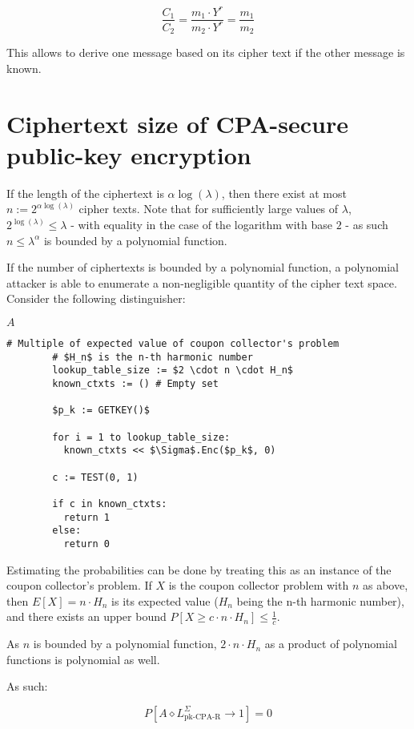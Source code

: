 \documentclass[a4paper]{scrreprt}
\begin{document}
\[
  \frac{C_1}{C_2} = \frac{m_1 \cdot Y^r}{m_2 \cdot Y^r} = \frac{m_1}{m_2}
\]

This allows to derive one message based on its cipher text if the other message
is known.

\section{Ciphertext size of CPA-secure public-key encryption}

If the length of the ciphertext is $\alpha \log(\lambda)$, then there exist at
most $n := 2^{\alpha \log(\lambda)}$ cipher texts. Note that for sufficiently large
values of $\lambda$, $2^{\log(\lambda)} \leq \lambda$ - with equality in the
case of the logarithm with base $2$ -  as such $n \leq
\lambda^\alpha$ is bounded by a polynomial function.

If the number of ciphertexts is bounded by a polynomial function, a polynomial
attacker is able to enumerate a non-negligible quantity of the cipher text
space. Consider the following distinguisher:

\begin{library}{$A$}
	\begin{lstlisting}[mathescape=true,autogobble=true]
		# Multiple of expected value of coupon collector's problem
		# $H_n$ is the n-th harmonic number
		lookup_table_size := $2 \cdot n \cdot H_n$
		known_ctxts := () # Empty set

		$p_k := GETKEY()$

		for i = 1 to lookup_table_size:
		  known_ctxts << $\Sigma$.Enc($p_k$, 0)

		c := TEST(0, 1)

		if c in known_ctxts:
		  return 1
		else:
		  return 0
	\end{lstlisting}
\end{library}

Estimating the probabilities can be done by treating this as an instance of the
coupon collector's problem. If $X$ is the coupon collector problem with $n$ as
above, then $E[X] = n \cdot H_n$ is its expected value ($H_n$ being the n-th
harmonic number), and there exists an upper bound $P[X \geq c \cdot n \cdot
H_n] \leq \frac{1}{c}$.

As $n$ is bounded by a polynomial function, $2 \cdot n \cdot H_n$ as a product
of polynomial functions is polynomial as well.

As such:

\[
	P\left[A \diamond L^\Sigma_{\text{pk-CPA-R}} \rightarrow 1\right] = 0
\]
\end{document}
